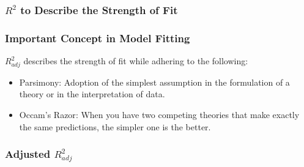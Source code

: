 \documentclass[handout]{beamer}
\newcommand{\blue}[1]{\textcolor{blue2}{#1}}
\begin{document}
\begin{frame}[fragile]
\frametitle{$R^2$ to Describe the Strength of Fit}

%

\end{frame}


\begin{frame}[fragile]
\frametitle{Important Concept in Model Fitting}

$R^2_{adj}$ describes the strength of fit while adhering to the following:
\begin{itemize}
\pause\item \blue{Parsimony}:  Adoption of the simplest assumption in the formulation of a theory or in the interpretation of data.
\pause\item \blue{Occam's Razor}: When you have two competing theories that make exactly the same predictions, the simpler one is the better.
\end{itemize}


\end{frame}


\begin{frame}[fragile]
\frametitle{Adjusted $R^2_{adj}$}

%

\end{frame}
\end{document}
